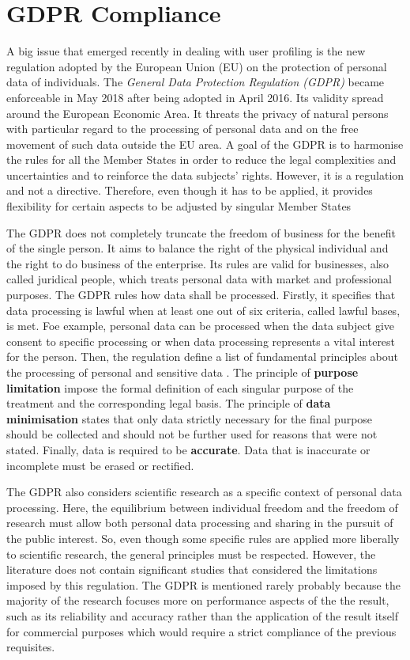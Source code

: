 \section{GDPR Compliance}
A big issue that emerged recently in dealing with user profiling is the new regulation adopted by the European Union (EU) on the protection of personal data of individuals.
The \emph{General Data Protection Regulation (GDPR)} became enforceable in May 2018 after being adopted in April 2016. Its validity spread around the European Economic Area.
It threats the privacy of natural persons with particular regard to the processing of personal data and on the free movement of such data outside the EU area.
A goal of the GDPR is to harmonise the rules for all the Member States in order to reduce the legal complexities and uncertainties and to reinforce the data subjects' rights.
However, it is a regulation and not a directive. Therefore, even though it has to be applied, it provides flexibility for certain aspects to be adjusted by singular Member States


The GDPR does not completely truncate the freedom of business for the benefit of the single person. It aims to balance the right of the physical individual and the right to do business of the enterprise.
Its rules are valid for businesses, also called juridical people, which treats personal data with market and professional purposes.
The GDPR rules how data shall be processed. Firstly, it specifies that data processing is lawful when at least one out of six criteria, called lawful bases, is met. Foe example, personal data can be processed when the data subject give consent to specific processing or when data processing represents a vital interest for the person.
Then, the regulation define a list of fundamental principles about the processing of personal and sensitive data \cite{voigt2017eu}. The principle of \textbf{purpose limitation} impose the formal definition of each singular purpose of the treatment and the corresponding legal basis.
The principle of \textbf{data minimisation} states that only data strictly necessary for the final purpose should be collected and should not be further used for reasons that were not stated.
Finally, data is required to be \textbf{accurate}. Data that is inaccurate or incomplete must be erased or rectified.


The GDPR also considers scientific research as a specific context of personal data processing. Here, the equilibrium between individual freedom and the freedom of research must allow both personal data processing and sharing in the pursuit of the public interest. 
So, even though some specific rules are applied more liberally to scientific research, the general principles must be respected.
However, the literature does not contain significant studies that considered the limitations imposed by this regulation.
The GDPR is mentioned rarely probably because the majority of the research focuses more on performance aspects of the the result, such as its reliability and accuracy rather than the application of the result itself for commercial purposes which would require a strict compliance of the previous requisites.


